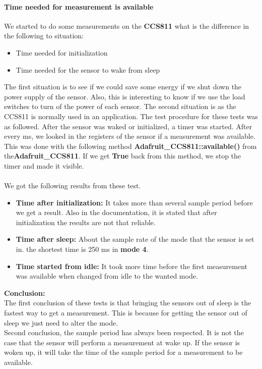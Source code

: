 \documentclass[11pt,a4paper]{article}
\begin{document}
\paragraph{Time needed for measurement is available}
We started to do some measurements on the \textbf{CCS811} what is the difference in the following to situation:
\begin{itemize}
	\item Time needed for initialization
	\item Time needed for the sensor to wake from sleep
\end{itemize}
The first situation is to see if we could save some energy if we shut down the power supply of the sensor. Also, this is interesting to know if we use the load switches to turn of the power of each sensor. The second situation is as the CCS811 is normally used in an application. The test procedure for these tests was as followed. After the sensor was waked or initialized, a timer was started. After every ms, we looked in the registers of the sensor if a measurement was available. This was done with the following method \textbf{Adafruit\_CCS811::available()} from the\textbf{Adafruit\_CCS811}. If we get \textbf{True} back from this method, we stop the timer and made it visible.
\\ \\
We got the following results from these test.
\begin{itemize}
\item \textbf{Time after initialization:} It takes more than several sample period before we get a result. Also in the documentation, it is stated that after initialization the results are not that reliable.
\item \textbf{Time after sleep:} About the sample rate of the mode that the sensor is set in. the shortest time is 250 ms in \textbf{mode 4}. 
\item \textbf{ Time started from idle:} It took more time before the first measurement was available when changed from idle to the wanted mode.
\end{itemize}
\textbf{Conclusion:} \\ The first conclusion of these tests is that bringing the sensors out of sleep is the fastest way to get a measurement. This is because for getting the sensor out of sleep we just need to alter the mode. 
\\ Second conclusion, the sample period has always been respected. It is not the case that the sensor will perform a measurement at wake up. If the sensor is woken up, it will take the time of the sample period for a measurement to be available.
\end{document}
